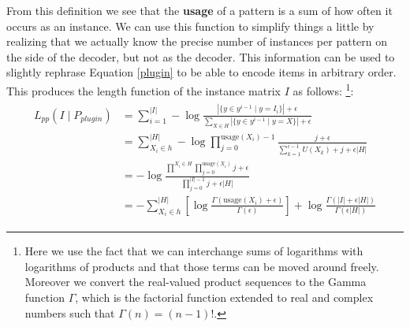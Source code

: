 \documentclass{llncs}
\begin{document}
From this definition we see that the \textbf{usage} of a pattern is a sum of how often it occurs as an instance. We can use this function to simplify things a little by realizing that we actually know the precise number of instances per pattern on the side of the decoder, but not as the decoder. This information can be used to slightly rephrase Equation \ref{plugin} to be able to encode items in arbitrary order. This produces the length function of the instance matrix ${I}$ as follows:
\footnote{Here we use the fact that we can interchange sums of logarithms with logarithms of products and that those terms can be moved around freely. Moreover we convert the real-valued product sequences to the Gamma function $\Gamma$, which is the factorial function extended to real and complex numbers such that $\Gamma(n) = (n-1)!$.}:
\begin{align}
\begin{split}
	L_{pp}({I}\mid P_{plugin}) &= \sum^{|{I}|}_{i=1} -\log \frac{|\{y \in y^{i-1} \mid y = {I}_i\}| + \epsilon }{\sum_{X \in H}|\{y \in y^{i-1} \mid y = X\}| + \epsilon}\\
	&= \sum^{|H|}_{X_i \in h} -\log \prod^{\mathrm{usage}(X_i)-1}_{j=0} \frac{j+\epsilon}{\sum^{i-1}_{k=1} U(X_k)+j+\epsilon|H|} \\
	&= -\log \frac{\prod^{X_i\in H} \prod^{\mathrm{usage}(X_i)}_{j=0} j + \epsilon}{\prod^{|{I}|-1}_{j=0} j + \epsilon|H|} \\
	&= -\sum^{|H|}_{X_i \in h} \left[ \log \frac{\Gamma(\mathrm{usage}(X_i)+\epsilon)}{\Gamma(\epsilon)}\right] + \log \frac{\Gamma(|{I}| + \epsilon|H|)}{\Gamma(\epsilon|H|)}
\end{split}
\end{align}

\end{document}
